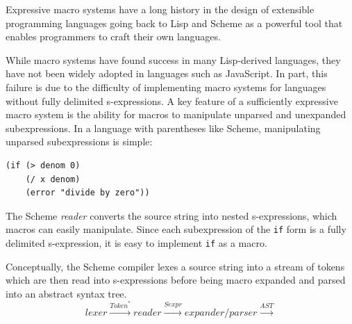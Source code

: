 \documentclass[preprint,10pt]{sigplanconf}
\begin{document}
Expressive macro systems have a long history in the design of
extensible programming languages going back to Lisp and Scheme
\cite{Kohlbecker1987,Foderaro1983} as a powerful tool that enables
programmers to craft their own languages.

While macro systems have found success in many Lisp-derived languages,
they have not been widely adopted in languages such as JavaScript. In
part, this failure is due to the difficulty of implementing macro
systems for languages without fully delimited s-expressions. A key
feature of a sufficiently expressive macro system is the ability for
macros to manipulate unparsed and unexpanded subexpressions. In a
language with parentheses like Scheme, manipulating unparsed
subexpressions is simple:
\begin{lstlisting}
(if (> denom 0)
    (/ x denom)
    (error "divide by zero"))
\end{lstlisting}
The Scheme \emph{reader} converts the source string into nested
s-expressions, which macros can easily manipulate. Since each
subexpression of the \verb!if! form is a fully delimited
s-expression, it is easy to implement \verb!if! as a
macro.


Conceptually, the Scheme compiler lexes a source string into
a stream of tokens which are then read into s-expressions
before being macro expanded and parsed into an abstract syntax tree.
\[
\textit{lexer} \xrightarrow{\textit{Token}^{*}}
\textit{reader} \xrightarrow{\textit{Sexpr}}
\textit{expander/parser} \xrightarrow{\textit{AST}}
\]
\end{document}
